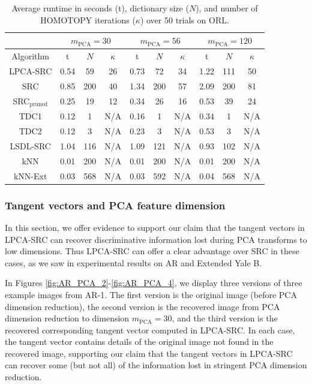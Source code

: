 \documentclass[review]{elsarticle}
\begin{document}
\begin{table}[!htb] 
\small{
\centering
\begin{tabular}{|c|c|c|c|c|c|c|c|c|c|}
\hline
& \multicolumn{3}{|c|}{$m_{\mathrm{PCA}} = 30$} & \multicolumn{3}{|c|}{$m_{\mathrm{PCA}} = 56$} & \multicolumn{3}{|c|}{$m_{\mathrm{PCA}} = 120$} \\
\hline
Algorithm & t & $N$ & $\kappa$ & t & $N$ & $\kappa$ & t & $N$ & $\kappa$ \\
\hline
	LPCA-SRC	&	0.54	&	59	&	26	&	0.73	&	72	&	34	&	1.22	&	111	&	50	\\
	SRC	&	0.85	&	200	&	40	&	1.34	&	200	&	57	&	2.09	&	200	&	81	\\
	SRC$_\mathrm{pruned}$	&	0.25	&	19	&	12	&	0.34	&	26	&	16	&	0.53	&	39	&	24	\\
	TDC1	&	0.12	&	1	&	N/A	&	0.16	&	1	&	N/A	&	0.34	&	1	&	N/A	\\
	TDC2	&	0.12	&	3	&	N/A	&	0.23	&	3	&	N/A	&	0.53	&	3	&	N/A	\\
	LSDL-SRC	&	1.04	&	116	&	N/A	&	1.09	&	121	&	N/A	&	0.93	&	102	&	N/A	\\
	kNN	&	0.01	&	200	&	N/A	&	0.01	&	200	&	N/A	&	0.01	&	200	&	N/A	\\
	kNN-Ext	&	0.03	&	568	&	N/A		&	0.03	&	592	&	N/A		&	0.04	&	568	&	N/A	\\

\hline
\end{tabular}
\caption{Average runtime in seconds (t), dictionary size ($N$), and number of HOMOTOPY iterations ($\kappa$) over 50 trials on ORL.} 
\label{ORL_time}}
\end{table}




\subsubsection{Tangent vectors and PCA feature dimension} \label{sec:pca_tv}

In this section, we offer evidence to support our claim that the tangent vectors in LPCA-SRC can recover discriminative information lost during PCA transforms to low dimensions. Thus LPCA-SRC can offer a clear advantage over SRC in these cases, as we saw in experimental results on AR and Extended Yale B. 

In Figures \ref{fig:AR_PCA_2}-\ref{fig:AR_PCA_4}, we display three versions of three example images from AR-1. The first version is the original image (before PCA dimension reduction), the second version is the recovered image from PCA dimension reduction to dimension $m_\mathrm{PCA} = 30$, and the third version is the recovered corresponding tangent vector computed in LPCA-SRC. In each case, the tangent vector contains details of the original image not found in the recovered image, supporting our claim that the tangent vectors in LPCA-SRC can recover some (but not all) of the information lost in stringent PCA dimension reduction. 
\end{document}
